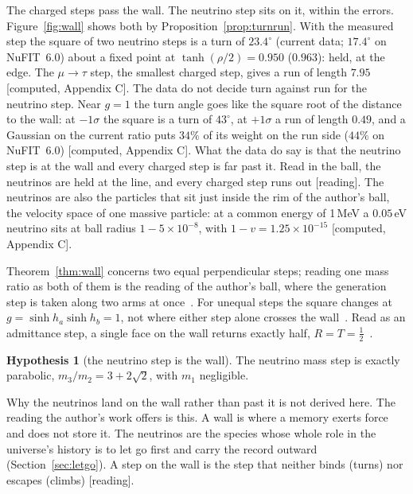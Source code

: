 \documentclass[11pt]{article}
\theoremstyle{definition}\newtheorem{hypothesis}{Hypothesis}\newtheorem{prediction}{Prediction}
\theoremstyle{remark}\newtheorem{remark}[theorem]{Remark}
\newcommand{\grade}[1]{\textsf{\small[#1]}}
\begin{document}
The charged steps pass the wall. The neutrino step sits on it, within the errors. Figure~\ref{fig:wall} shows both by Proposition~\ref{prop:turnrun}. With the measured step the square of two neutrino steps is a turn of $23.4^\circ$ (current data; $17.4^\circ$ on NuFIT~6.0) about a fixed point at $\tanh(\rho/2)=0.950$ ($0.963$): held, at the edge. The $\mu\to\tau$ step, the smallest charged step, gives a run of length $7.95$ \grade{computed, Appendix C}. The data do not decide turn against run for the neutrino step. Near $g=1$ the turn angle goes like the square root of the distance to the wall: at $-1\sigma$ the square is a turn of $43^\circ$, at $+1\sigma$ a run of length $0.49$, and a Gaussian on the current ratio puts $34\%$ of its weight on the run side ($44\%$ on NuFIT~6.0) \grade{computed, Appendix C}. What the data do say is that the neutrino step is at the wall and every charged step is far past it. Read in the ball, the neutrinos are held at the line, and every charged step runs out \grade{reading}. The neutrinos are also the particles that sit just inside the rim of the author's ball, the velocity space of one massive particle: at a common energy of 1\,MeV a $0.05$\,eV neutrino sits at ball radius $1-5\times10^{-8}$, with $1-v=1.25\times10^{-15}$ \grade{computed, Appendix C}.

Theorem~\ref{thm:wall} concerns two equal perpendicular steps; reading one mass ratio as both of them is the reading of the author's ball, where the generation step is taken along two arms at once~\cite{SMball,Mixer2}. For unequal steps the square changes at $g=\sinh h_a\sinh h_b=1$, not where either step alone crosses the wall~\cite{Mixer2}. Read as an admittance step, a single face on the wall returns exactly half, $R=T=\tfrac12$~\cite{Mixer2}.

\begin{hypothesis}[the neutrino step is the wall]\label{hyp:mass}
The neutrino mass step is exactly parabolic, $m_3/m_2=3+2\sqrt2$, with $m_1$ negligible.
\end{hypothesis}

Why the neutrinos land on the wall rather than past it is not derived here. The reading the author's work offers is this. A wall is where a memory exerts force and does not store it. The neutrinos are the species whose whole role in the universe's history is to let go first and carry the record outward (Section~\ref{sec:letgo}). A step on the wall is the step that neither binds (turns) nor escapes (climbs) \grade{reading}.
\end{document}

